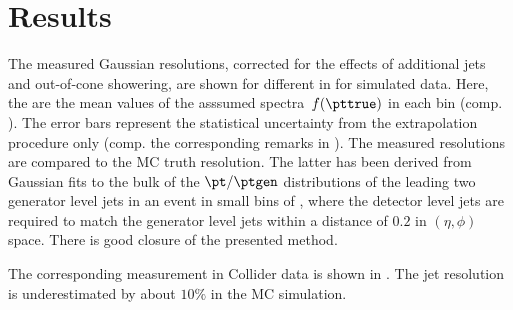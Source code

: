 \section{Results}

The measured Gaussian resolutions, corrected for the effects of
additional jets and out-of-cone showering, are shown for different
\ptref in  for simulated
data.
Here, the \ptref are the mean values of the asssumed spectra~$f(\pttrue)$
in each \ptave bin (comp. ).
The error bars represent the statistical uncertainty from the
extrapolation procedure only (comp. the corresponding remarks in
).
The measured resolutions are compared to the MC truth resolution.
The latter has been derived from Gaussian fits to the bulk of the
\mbox{$\pt / \ptgen$} distributions of the leading two generator
level jets in an event in small bins of \ptgen, where the
detector level jets are required to match the generator level jets
within a distance of $0.2$ in \mbox{$(\eta,\phi)$} space.
There is good closure of the presented method.

The corresponding measurement in Collider data is shown in .
The jet \pt resolution is underestimated by about $10\%$ in the MC simulation.

